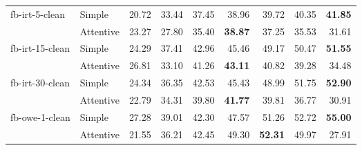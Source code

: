 \begin{tabular}{| l | l | r | r | r | r | r | r | r |}
    \multirow{2}{*}{fb-irt-5-clean}
    & Simple    & 20.72 & 33.44 & 37.45 & 38.96 & 39.72 & 40.35 & \textbf{41.85} \\
    & Attentive & 23.27 & 27.80 & 35.40 & \textbf{38.87} & 37.25 & 35.53 & 31.61 \\ \hline

    \multirow{2}{*}{fb-irt-15-clean}
    & Simple    & 24.29 & 37.41 & 42.96 & 45.46 & 49.17 & 50.47 & \textbf{51.55} \\
    & Attentive & 26.81 & 33.10 & 41.26 & \textbf{43.11} & 40.82 & 39.28 & 34.48 \\ \hline

    \multirow{2}{*}{fb-irt-30-clean}
    & Simple    & 24.34 & 36.35 & 42.53 & 45.43 & 48.99 & 51.75 & \textbf{52.90} \\
    & Attentive & 22.79 & 34.31 & 39.80 & \textbf{41.77} & 39.81 & 36.77 & 30.91 \\ \hline

    \multirow{2}{*}{fb-owe-1-clean}
    & Simple    & 27.28 & 39.01 & 42.30 & 47.57 & 51.26 & 52.72 & \textbf{55.00} \\
    & Attentive & 21.55 & 36.21 & 42.45 & 49.30 & \textbf{52.31} & 49.97 & 27.91 \\ \hline

\end{tabular}
